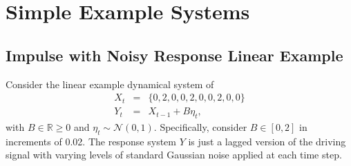 \documentclass[a4paper,11pt,twocolumn]{article}
\begin{document}
\section{Simple Example Systems}

\subsection{Impulse with Noisy Response Linear Example}
Consider the linear example dynamical system of
\begin{eqnarray}
\label{eq:linearex1}
X_t &=& \{0,2,0,0,2,0,0,2,0,0\}\\
Y_t &=& X_{t-1}+B\eta_t,
\end{eqnarray}
with $B\in\mathbb{R}\ge 0$ and $\eta_t\sim\mathcal{N}\left(0,1\right)$.  Specifically, consider $B\in[0,2]$ in increments of 0.02.  The response system $Y$ is just a lagged version of the driving signal with varying levels of standard Gaussian noise applied at each time step.  
\end{document}
